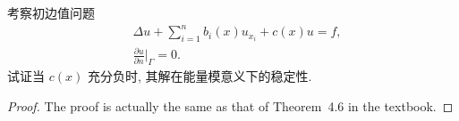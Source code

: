 \begin{exercise}
  考察初边值问题
  \begin{align*}
    & \Delta u + \sum_{i=1}^{n} b_i(x) u_{x_i} + c(x)u = f, \\
    & \frac{\partial u}{\partial n}\bigg|_{\varGamma} = 0.
  \end{align*}
  试证当 $c(x)$ 充分负时, 其解在能量模意义下的稳定性.
\end{exercise}

\begin{proof}
  The proof is actually the same as that of Theorem~4.6 in the textbook.
\end{proof}